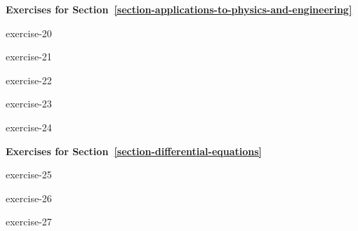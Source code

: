 \documentclass[10pt,]{book}
\numberwithin{equation}{section}
\begin{document}
\textbf{Exercises for Section~\ref*{section-applications-to-physics-and-engineering}}\space\space\hypertarget{exercisegroup-6}{}%
\begin{exercisegroup}{1}
\begin{divisionexercise}{20}{}{}{exercise-20}%
\end{divisionexercise}%
\begin{divisionexercise}{21}{}{}{exercise-21}%
\end{divisionexercise}%
\begin{divisionexercise}{22}{}{}{exercise-22}%
\end{divisionexercise}%
\begin{divisionexercise}{23}{}{}{exercise-23}%
\end{divisionexercise}%
\begin{divisionexercise}{24}{}{}{exercise-24}%
\end{divisionexercise}%
\end{exercisegroup}
\par\medskip\noindent
\par\medskip\noindent%
\textbf{Exercises for Section~\ref*{section-differential-equations}}\space\space\hypertarget{exercisegroup-7}{}%
\begin{exercisegroup}{1}
\begin{divisionexercise}{25}{}{}{exercise-25}%
\end{divisionexercise}%
\begin{divisionexercise}{26}{}{}{exercise-26}%
\end{divisionexercise}%
\begin{divisionexercise}{27}{}{}{exercise-27}%
\end{divisionexercise}%
\end{exercisegroup}
\par\medskip\noindent
%
%
\typeout{************************************************}
\typeout{************************************************}
%
\end{document}
